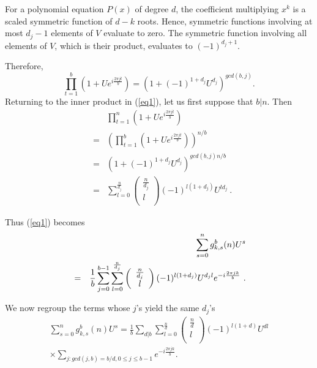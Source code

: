 \documentclass[10pt,conference]{IEEEtran}
\begin{document}
For a polynomial equation $P(x)$ of degree $d$, the coefficient
multiplying $x^k$ is a scaled symmetric function of $d-k$ roots.
Hence, symmetric functions involving at most $d_j-1$ elements of $V$
evaluate to zero. The symmetric function involving all elements of
$V$, which is their product, evaluates to $(-1)^{d_j+1}$.

Therefore,
\begin{equation}
\prod_{t=1}^b (1+Ue^{i\frac{2\pi
jt}{b}})=\left(1+(-1)^{1+d_j}U^{d_j}
\right)^{gcd(b,j)}.
\end{equation}
 Returning to the inner product in (\ref{eq1}), let us first
suppose that $b|n$. Then
\begin{equation}
\begin{array}{lll}
{}&{}&\prod_{t=1}^n \left(1+Ue^{i\frac{2\pi jt}{b}}\right)\\
{}&=&\left(\prod_{t=1}^b \left(1+Ue^{i\frac{2\pi
jt}{b}}\right)\right)^{n/b}\\
{}&=&\left(1+(-1)^{1+d_j}U^{d_j}
\right)^{gcd(b,j)n/b}\\
{}&=&\sum_{l=0}^{\frac{n}{d_j}} \left( \begin{array}{c}
                             \frac{n}{d_j} \\
                             l \\
                           \end{array}
                           \right)
(-1)^{l(1+d_j)}U^{ld_j}~.
\end{array}
\end{equation}

Thus (\ref{eq1}) becomes
\begin{eqnarray*}
{}&{}&\sum_{s=0}^n g^b_{k,s}(n)U^s\\&=&\frac{1}{b}\sum_{j=0}^{b-1}
\sum_{l=0}^{\frac{n}{d_j}} \left(
\begin{array}{c}
                             \frac{n}{d_j} \\
                             l \\
                           \end{array}
                           \right)(-1)^{l(1+d_j)}U^{d_jl}e^{-i\frac{2\pi
                           j k}{b}}~.\hspace{0.0in}
                           \end{eqnarray*}

We now regroup the terms whose $j$'s yield the same $d_j$'s
\begin{eqnarray*}
\sum_{s=0}^n g^b_{k,s}(n)U^s=\frac{1}{b}\sum_{d|b}
\sum_{l=0}^{\frac{n}{d}} \left(
\begin{array}{c}
                             \frac{n}{d} \\
                             l \\
                           \end{array}
                           \right)(-1)^{l(1+d)}U^{d l}\\ \times
\sum_{j: gcd(j,b)=b/d, 0 \leq j\leq b-1}e^{-i\frac{2\pi
                           j k}{b}}.
\end{eqnarray*}
\end{document}
